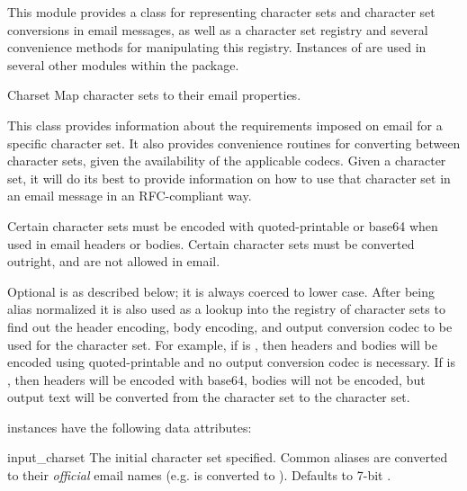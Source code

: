 
This module provides a class  for representing
character sets and character set conversions in email messages, as
well as a character set registry and several convenience methods for
manipulating this registry.  Instances of  are used in
several other modules within the  package.


\begin{classdesc}{Charset}{}
Map character sets to their email properties.

This class provides information about the requirements imposed on
email for a specific character set.  It also provides convenience
routines for converting between character sets, given the availability
of the applicable codecs.  Given a character set, it will do its best
to provide information on how to use that character set in an email
message in an RFC-compliant way.

Certain character sets must be encoded with quoted-printable or base64
when used in email headers or bodies.  Certain character sets must be
converted outright, and are not allowed in email.

Optional  is as described below; it is always
coerced to lower case.  After being alias normalized it is also used
as a lookup into the registry of character sets to find out the header
encoding, body encoding, and output conversion codec to be used for
the character set.  For example, if
 is , then headers and bodies will
be encoded using quoted-printable and no output conversion codec is
necessary.  If  is , then headers will
be encoded with base64, bodies will not be encoded, but output text
will be converted from the  character set to the
 character set.
\end{classdesc}

 instances have the following data attributes:

\begin{datadesc}{input_charset}
The initial character set specified.  Common aliases are converted to
their \emph{official} email names (e.g.  is converted to
).  Defaults to 7-bit .
\end{datadesc}

